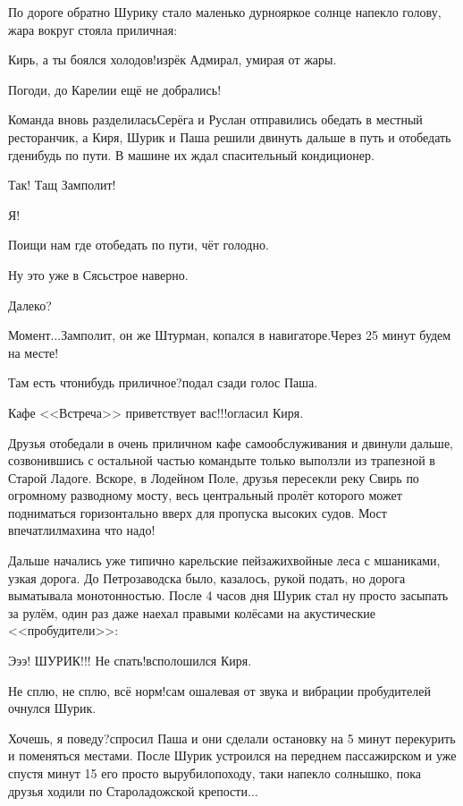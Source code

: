 По дороге обратно Шурику стало маленько дурно\mdash яркое солнце напекло голову, жара вокруг стояла приличная:

\diagdash Кирь, а ты боялся холодов!\mdash изрёк Адмирал, умирая от жары.

\diagdash Погоди, до Карелии ещё не добрались!

Команда вновь разделилась\mdash Серёга и Руслан отправились обедать в местный ресторанчик, а Киря, Шурик и Паша решили двинуть дальше в путь и отобедать где\sdash нибудь по пути. В машине их ждал спасительный кондиционер.

\diagdash Так! Тащ Замполит!

\diagdash Я!

\diagdash Поищи нам где отобедать по пути, чёт голодно.

\diagdash Ну это уже в Сясьстрое наверно.

\diagdash Далеко?

\diagdash Момент$\ldots$\mdash Замполит, он же Штурман, копался в навигаторе.\mdash Через 25 минут будем на месте!

\diagdash Там есть что\sdash нибудь приличное?\mdash подал сзади голос Паша.

\diagdash Кафе <<Встреча>> приветствует вас!!!\mdash огласил Киря.

Друзья отобедали в очень приличном кафе самообслуживания и двинули дальше, созвонившись с остальной частью команды\mdash те только выползли из трапезной в Старой Ладоге. Вскоре, в Лодейном Поле, друзья пересекли реку Свирь по огромному разводному мосту, весь центральный пролёт которого может подниматься горизонтально вверх для пропуска высоких судов. Мост впечатлил\mdash махина что надо!

Дальше начались уже типично карельские пейзажи\mdash хвойные леса с мшаниками, узкая дорога. До Петрозаводска было, казалось, рукой подать, но дорога выматывала монотонностью. После 4 часов дня Шурик стал ну просто засыпать за рулём, один раз даже наехал правыми колёсами на акустические <<пробудители>>:

\diagdash Э\sdash э\sdash э! ШУРИК!!! Не спать!\mdash всполошился Киря.

\diagdash Не сплю, не сплю, всё норм!\mdash сам ошалевая от звука и вибрации пробудителей очнулся Шурик.

\diagdash Хочешь, я поведу?\mdash спросил Паша и они сделали остановку на 5 минут перекурить и поменяться местами. После Шурик устроился на переднем пассажирском и уже спустя минут 15 его просто вырубило\mdash походу, таки напекло солнышко, пока друзья ходили по Староладожской крепости$\ldots$

